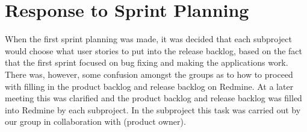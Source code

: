 \section{Response to Sprint Planning}\label{sec:s1p_response}
When the first sprint planning was made, it was decided that each subproject would choose what user stories to put into the release backlog, based on the fact that the first sprint focused on bug fixing and making the applications work. There was, however, some confusion amongst the groups as to how to proceed with filling in the product backlog and release backlog on Redmine. At a later meeting this was clarified and the product backlog and release backlog was filled into Redmine by each subproject. In the \bd subproject this task was carried out by our group in collaboration with  (\bd product owner).